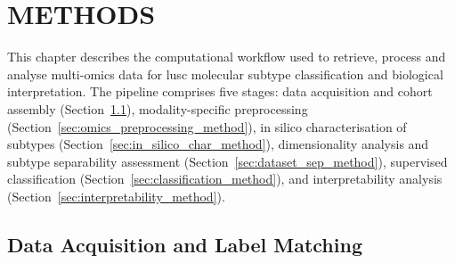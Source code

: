 \chapter{METHODS}
\label{chap:methods}
This chapter describes the computational workflow used to retrieve, process and analyse multi-omics data for \gls{lusc} molecular subtype classification and biological interpretation. The pipeline comprises five stages: data acquisition and cohort assembly (Section~\ref{sec:data_acquisition_method}), modality-specific preprocessing (Section~\ref{sec:omics_preprocessing_method}), in silico characterisation of subtypes (Section~\ref{sec:in_silico_char_method}), dimensionality analysis and subtype separability assessment (Section~\ref{sec:dataset_sep_method}), supervised classification (Section~\ref{sec:classification_method}), and interpretability analysis (Section~\ref{sec:interpretability_method}).

\section{Data Acquisition and Label Matching}
\label{sec:data_acquisition_method}

